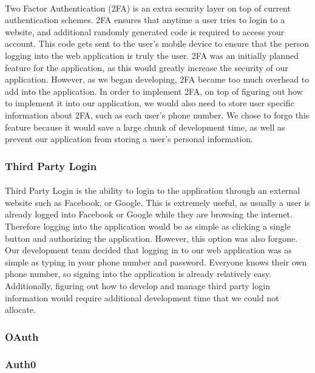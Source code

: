 \documentclass[12pt]{article}
\begin{document}
	\paragraph{}
		Two Factor Authentication (2FA) is an extra security layer on top of current authentication schemes. 2FA ensures that anytime a user tries to login to a website, and additional randomly generated code is required to access your account. This code gets sent to the user's mobile device to ensure that the person logging into the web application is truly the user. 2FA was an initially planned feature for the application, as this would greatly increase the security of our application. However, as we began developing, 2FA became too much overhead to add into the application. In order to implement 2FA, on top of figuring out how to implement it into our application, we would also need to store user specific information about 2FA, such as each user's phone number. We chose to forgo this feature because it would save a large chunk of development time, as well as prevent our application from storing a user's personal information.
	
	\subsubsection{Third Party Login}
	\paragraph{}
		Third Party Login is the ability to login to the application through an external website such as Facebook, or Google. This is extremely useful, as usually a user is already logged into Facebook or Google while they are browsing the internet. Therefore logging into the application would be as simple as clicking a single button and authorizing the application. However, this option was also forgone. Our development team decided that logging in to our web application was as simple as typing in your phone number and password. Everyone knows their own phone number, so signing into the application is already relatively easy. Additionally, figuring out how to develop and manage third party login information would require additional development time that we could not allocate.
	
	\subsubsection{OAuth}
	\subsubsection{Auth0}
\end{document}
